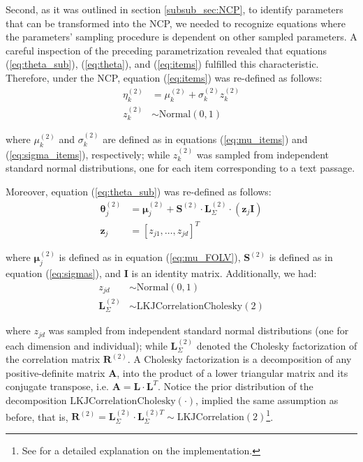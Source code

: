 Second, as it was outlined in section \ref{subsub_sec:NCP}, to identify parameters that can be transformed into the NCP, we needed to recognize equations where the parameters' sampling procedure is dependent on other sampled parameters. A careful inspection of the preceding parametrization revealed that equations (\ref{eq:theta_sub}), (\ref{eq:theta}), and (\ref{eq:items}) fulfilled this characteristic. Therefore, under the NCP, equation (\ref{eq:items}) was re-defined as follows:
%
\begin{align}
	\eta^{(2)}_{k} &= \mu^{(2)}_{k} + \sigma^{(2)}_{k} z^{(2)}_{k} \\
	z^{(2)}_{k} &\sim \text{Normal}(0,1)
\end{align}

\noindent where $\mu^{(2)}_{k}$ and $\sigma^{(2)}_{k}$ are defined as in equations (\ref{eq:mu_items}) and (\ref{eq:sigma_items}), respectively; while $z^{(2)}_{k}$ was sampled from independent standard normal distributions, one for each item corresponding to a text passage.

Moreover, equation (\ref{eq:theta_sub}) was re-defined as follows:
%
\begin{align}
	\boldsymbol{\theta}^{(2)}_{j} &= \boldsymbol{\mu}^{(2)}_{j} + \boldsymbol{S}^{(2)} \cdot \boldsymbol{L}^{(2)}_{\Sigma} \cdot  (\mathbf{z}_{j} \mathbf{I}) \\
	\mathbf{z}_{j} &= [ z_{j1}, \dots, z_{jd}]^{T}
\end{align}

\noindent where $\boldsymbol{\mu}^{(2)}_{j}$ is defined as in equation (\ref{eq:mu_FOLV}), $\boldsymbol{S}^{(2)}$ is defined as in equation (\ref{eq:sigmas}), and $\mathbf{I}$ is an identity matrix. Additionally, we had:
%
\begin{align}
	z_{jd} &\sim \text{Normal}(0,1) \\
	\boldsymbol{L}^{(2)}_{\Sigma} &\sim \text{LKJCorrelationCholesky}(2)
\end{align}

\noindent where $z_{jd}$ was sampled from independent standard normal distributions (one for each dimension and individual); while $\boldsymbol{L}^{(2)}_{\Sigma}$ denoted the Cholesky factorization of the correlation matrix $\boldsymbol{R}^{(2)}$. A Cholesky factorization is a decomposition of any positive-definite matrix $\mathbf{A}$, into the product of a lower triangular matrix and its conjugate transpose, i.e. $\mathbf{A} = \boldsymbol{L} \cdot \boldsymbol{L}^{T}$. Notice the prior distribution of the decomposition $\text{LKJCorrelationCholesky}(\cdot)$, implied the same assumption as before, that is, $\boldsymbol{R}^{(2)} = \boldsymbol{L}^{(2)}_{\Sigma} \cdot \boldsymbol{L}^{(2)T}_{\Sigma} \sim  \text{LKJCorrelation}(2)$\footnote{See \citet{Stan2020} for a detailed explanation on the implementation.}.

